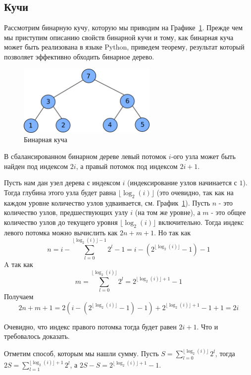 \subsection{Кучи}

Рассмотрим бинарную кучу, которую мы приводим на Графике~\ref{fig:binary_heap}.  
Прежде чем мы приступим описанию свойств бинарной кучи и тому, как бинарная куча может быть реализована в 
языке Python, приведем теорему, результат который позволяет эффективно обходить бинарное дерево. 

\begin{figure}
\centering
\includegraphics[width=0.6\textwidth]{graphics/binary_heap.png}
\caption{Бинарная куча}
\label{fig:binary_heap}
\end{figure}

\begin{theorem}
В сбалансированном бинарном дереве левый потомок $i$-ого узла может быть найден под 
индексом $2i$, а правый потомок под индексом $2i+1$.
\end{theorem}

Пусть нам дан узел дерева с индексом $i$ (индексирование узлов начинается с $1$). Тогда глубина этого узла 
будет равна $\lfloor \log_2(i) \rfloor$ (это очевидно, так как на каждом 
уровне количество узлов удваивается, см. График~\ref{fig:binary_heap}). Пусть $n$ - это количество узлов, 
предшествующих узлу $i$ (на том же уровне), а $m$ - это общее количество узлов
до текущего уровня $\lfloor \log_2(i) \rfloor$ включительно. Тогда индекс 
левого потомка можно вычислить как $2n + m+1$. Но так как
$$n = i - \sum_{l=0}^{\lfloor \log_2(i) \rfloor - 1} 2^l - 1 = i - (2^{\lfloor \log_2(i) \rfloor} - 1) - 1$$ 
A так как
$$m=\sum_{l=0}^{\lfloor \log_2(i) \rfloor} 2^l = 2^{\lfloor \log_2(i) \rfloor + 1} - 1$$
Получаем
$$2n+m+1= 2(i - (2^{\lfloor \log_2(i) \rfloor} - 1) - 1) + 2^{\lfloor \log_2(i) \rfloor + 1} - 1 + 1 = 2i$$ 

Очевидно, что индекс правого потомка тогда будет равен $2i+1$.
Что и требовалось доказать.

Отметим способ, которым мы нашли сумму. Пусть $S=\sum_{l=0}^{\lfloor \log_2(i) \rfloor} 2^l$, тогда 
$2S=\sum_{l=1}^{\lfloor \log_2(i) \rfloor + 1} 2^l$, а $2S-S = 2^{\lfloor \log_2(i) \rfloor + 1} - 1$.



